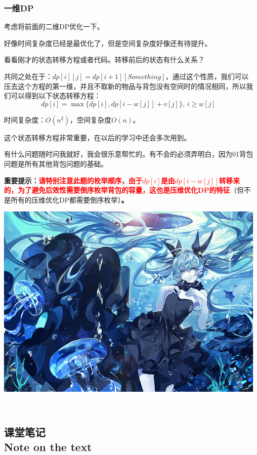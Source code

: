 \documentclass{article}
\theoremstyle{nonumberplain}
\newcommand{\note}{\ \par


	\subsection*{课堂笔记\\\tiny{Note on the text}}
	\newpage}
\begin{document}
\subsubsection{一维DP}
考虑将前面的二维DP优化一下。

好像时间复杂度已经是最优化了，但是空间复杂度好像还有待提升。

看看刚才的状态转移方程或者代码。转移前后的状态有什么关系？

共同之处在于：$dp[i][j]=dp[i+1][Something]$，通过这个性质，我们可以压去这个方程的第一维，并且不取新的物品与背包没有空间时的情况相同，所以我们可以得到以下状态转移方程：
\begin{equation*}dp[i]=\max\{dp[i],dp[i-w[j]]+v[j]\},\ i\geq w[j]\end{equation*}

时间复杂度：$O(n^2)$，空间复杂度$O(n)$。

这个状态转移方程非常重要，在以后的学习中还会多次用到。

有什么问题随时问我就好，我会很乐意帮忙的。有不会的必须弄明白，因为01背包问题是所有其他背包问题的基础。

\textbf{重要提示：}\textcolor{red}{\textbf{请特别注意此题的枚举顺序，由于$dp[i]$是由$dp[i-w[j]]$转移来的，为了避免后效性需要倒序枚举背包的容量，这也是压维优化DP的特征}}（但不是所有的压维优化DP都需要倒序枚举）\textcolor{black}{\textbf{。}}

\begin{center}\includegraphics{57249514_p0.png}\end{center}
\note
\end{document}
